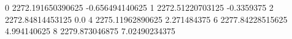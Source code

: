 0 2272.191650390625 -0.656494140625
1 2272.51220703125 -0.3359375
2 2272.84814453125 0.0
4 2275.11962890625 2.271484375
6 2277.84228515625 4.994140625
8 2279.873046875 7.02490234375

